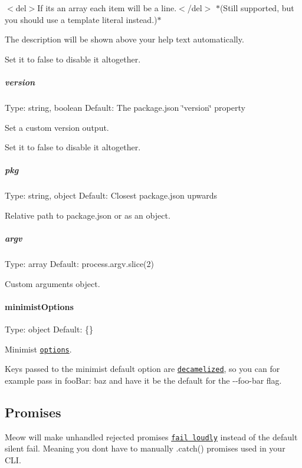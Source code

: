 $<$del$>$If it\textquotesingle{}s an array each item will be a line.$<$/del$>$ $\ast$(Still supported, but you should use a template literal instead.)$\ast$

The description will be shown above your help text automatically.

Set it to {\ttfamily false} to disable it altogether.

\subparagraph*{version}

Type\+: {\ttfamily string}, {\ttfamily boolean} Default\+: The package.\+json {\ttfamily \char`\"{}version\char`\"{}} property

Set a custom version output.

Set it to {\ttfamily false} to disable it altogether.

\subparagraph*{pkg}

Type\+: {\ttfamily string}, {\ttfamily object} Default\+: Closest package.\+json upwards

Relative path to package.\+json or as an object.

\subparagraph*{argv}

Type\+: {\ttfamily array} Default\+: {\ttfamily process.\+argv.\+slice(2)}

Custom arguments object.

\paragraph*{minimist\+Options}

Type\+: {\ttfamily object} Default\+: {\ttfamily \{\}}

Minimist \href{https://github.com/substack/minimist#var-argv--parseargsargs-opts}{\tt options}.

Keys passed to the minimist {\ttfamily default} option are \href{https://github.com/sindresorhus/decamelize}{\tt decamelized}, so you can for example pass in {\ttfamily foo\+Bar\+: \textquotesingle{}baz\textquotesingle{}} and have it be the default for the {\ttfamily -\/-\/foo-\/bar} flag.

\subsection*{Promises}

Meow will make unhandled rejected promises \href{https://github.com/sindresorhus/loud-rejection}{\tt fail loudly} instead of the default silent fail. Meaning you don\textquotesingle{}t have to manually {\ttfamily .catch()} promises used in your C\+LI.

